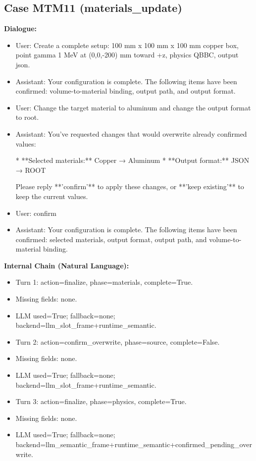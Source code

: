\documentclass[11pt]{ctexart}
\begin{document}
\subsection{Case MTM11 (materials\_update)}
\textbf{Dialogue:}
\begin{itemize}
\item User: Create a complete setup: 100 mm x 100 mm x 100 mm copper box, point gamma 1 MeV at (0,0,-200) mm toward +z, physics QBBC, output json.
\item Assistant: Your configuration is complete. The following items have been confirmed: volume-to-material binding, output path, and output format.
\item User: Change the target material to aluminum and change the output format to root.
\item Assistant: You've requested changes that would overwrite already confirmed values:

*   **Selected materials:** Copper → Aluminum
*   **Output format:** JSON → ROOT

Please reply **'confirm'** to apply these changes, or **'keep existing'** to keep the current values.
\item User: confirm
\item Assistant: Your configuration is complete. The following items have been confirmed: selected materials, output format, output path, and volume-to-material binding.
\end{itemize}
\textbf{Internal Chain (Natural Language):}
\begin{itemize}
\item Turn 1: action=finalize, phase=materials, complete=True.
\item Missing fields: none.
\item LLM used=True; fallback=none; backend=llm\_slot\_frame+runtime\_semantic.
\item Turn 2: action=confirm\_overwrite, phase=source, complete=False.
\item Missing fields: none.
\item LLM used=True; fallback=none; backend=llm\_slot\_frame+runtime\_semantic.
\item Turn 3: action=finalize, phase=physics, complete=True.
\item Missing fields: none.
\item LLM used=True; fallback=none; backend=llm\_semantic\_frame+runtime\_semantic+confirmed\_pending\_overwrite.
\end{itemize}
\end{document}
